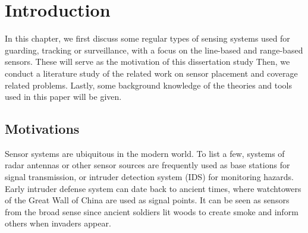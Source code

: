 
\chapter{Introduction} 
\thispagestyle{myheadings} 
In this chapter, we first discuss some regular types of sensing systems 
used for guarding, tracking or surveillance, 
with a focus on the line-based and range-based sensors. 
These will serve as the motivation of this dissertation study
Then, we conduct a literature study of the related work on sensor placement and 
coverage related problems. 
Lastly, some background knowledge of the theories and tools used in this paper will be given. 

\section{Motivations} 
Sensor systems are ubiquitous in the modern world. 
To list a few, systems of radar antennas 
or other sensor sources are frequently used as base stations for signal transmission, 
or intruder detection system (IDS) for monitoring hazards. 
Early intruder defense system can date back to ancient times, where 
watchtowers of the Great Wall of China are used as signal points. 
It can be seen as sensors from the broad sense 
since ancient soldiers lit woods to create smoke and inform others when invaders appear. 
